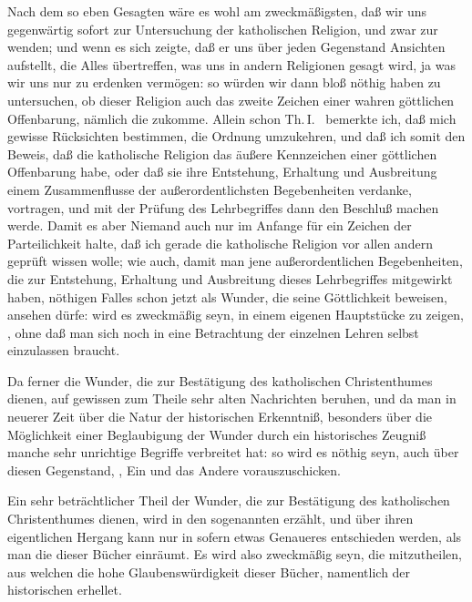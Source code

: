 \begin{aufza}
\item Nach dem so eben Gesagten wäre es wohl am zweckmäßigsten, daß wir uns gegenwärtig sofort zur Untersuchung der katholischen Religion, und zwar zur  wenden; und wenn es sich zeigte, daß er uns über jeden Gegenstand Ansichten aufstellt, die Alles übertreffen, was uns in andern Religionen gesagt wird, ja was wir uns nur zu erdenken vermögen: so würden wir dann bloß nöthig haben zu untersuchen, ob dieser Religion auch das zweite Zeichen einer wahren göttlichen Offenbarung, nämlich die  zukomme. Allein schon Th.\,I.\  bemerkte ich, daß mich gewisse Rücksichten bestimmen, die Ordnung umzukehren, und daß ich somit den Beweis, daß die katholische Religion das äußere Kennzeichen einer göttlichen Offenbarung habe, oder daß sie ihre Entstehung, Erhaltung und Ausbreitung einem Zusammenflusse der außerordentlichsten Begebenheiten verdanke,  vortragen, und mit der Prüfung des Lehrbegriffes dann den Beschluß machen werde. Damit es aber Niemand auch nur im Anfange für ein Zeichen der Parteilichkeit halte, daß ich gerade die katholische Religion vor allen andern geprüft wissen wolle; wie auch, damit man jene außerordentlichen Begebenheiten, die zur Entstehung, Erhaltung und Ausbreitung dieses Lehrbegriffes mitgewirkt haben, nöthigen Falles schon jetzt als Wunder, die seine Göttlichkeit beweisen, ansehen dürfe: wird es zweckmäßig seyn, in einem eigenen Hauptstücke zu zeigen, , ohne daß man sich noch in eine Betrachtung der einzelnen Lehren selbst einzulassen braucht.
\item Da ferner die Wunder, die zur Bestätigung des katholischen Christenthumes dienen, auf gewissen zum Theile sehr alten Nachrichten beruhen, und da man in neuerer Zeit über die Natur der historischen Erkenntniß, besonders über die Möglichkeit einer Beglaubigung der Wunder durch ein historisches Zeugniß manche sehr unrichtige Begriffe verbreitet hat: so wird es nöthig seyn, auch über diesen Gegenstand, , Ein und das Andere vorauszuschicken.
\item Ein sehr beträchtlicher Theil der Wunder, die zur Bestätigung des katholischen Christenthumes dienen, wird in den sogenannten  erzählt, und über ihren eigentlichen Hergang kann nur in sofern etwas Genaueres entschieden werden, als man die  dieser Bücher einräumt. Es wird also zweckmäßig seyn, die  mitzutheilen, aus welchen die hohe Glaubenswürdigkeit dieser Bücher, namentlich der historischen erhellet.~

\end{aufza}
